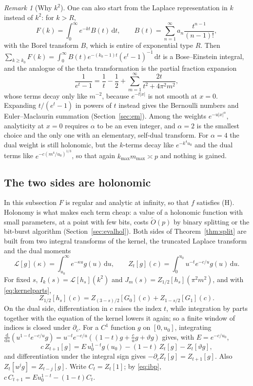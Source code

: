 \documentclass[11pt,reqno]{amsart}
\theoremstyle{definition}
\theoremstyle{remark}
\newtheorem{remark}[theorem]{Remark}
\newcommand{\dd}{\,\mathrm{d}}
\begin{document}
\begin{remark}[Why $k^2$]\label{rem:whyk2}
One can also start from the Laplace representation in $k$ instead of $k^2$: for $k > R$,
\[
  F(k) = \int_0^\infty e^{-kt}B(t)\dd t, \qquad B(t) = \sum_{n=1}^{\infty}a_n\frac{t^{n-1}}{(n-1)!},
\]
with the Borel transform $B$, which is entire of exponential type $R$. Then $\sum_{k\ge k_0}F(k) =
\int_0^\infty B(t)e^{-(k_0-1)t}(e^t-1)^{-1}\dd t$ is a Bose--Einstein integral, and the analogue of the theta
transformation is the partial fraction expansion
\[
  \frac{1}{e^t-1} = \frac1t - \frac12 + \sum_{m=1}^{\infty}\frac{2t}{t^2+4\pi^2m^2},
\]
whose terms decay only like $m^{-2}$, because $e^{-t|x|}$ is not smooth at $x = 0$. Expanding $t/(e^t-1)$ in powers of
$t$ instead gives the Bernoulli numbers and Euler--Maclaurin summation (Section~\ref{sec:em}). Among the weights
$e^{-u|x|^\alpha}$, analyticity at $x = 0$ requires $\alpha$ to be an even integer, and $\alpha = 2$ is the smallest choice
and the only one with an elementary, self-dual transform. For $\alpha = 4$ the dual weight is still holonomic, but the
$k$-terms decay like $e^{-k^4u_0}$ and the dual terms like $e^{-c(m^4/u_0)^{1/3}}$, so that again $k_{\max}m_{\max} \asymp p$
and nothing is gained.
\end{remark}

\subsection{The two sides are holonomic}\label{sec:twosides}
In this subsection $F$ is regular and analytic at infinity, so that $f$ satisfies (H). Holonomy is what makes each term
cheap: a value of a holonomic function with small parameters, at a point with few bits, costs $\widetilde O(p)$ by
binary splitting or the bit-burst algorithm (Section~\ref{sec:evalhol}). Both sides of Theorem~\ref{thm:split} are built from two integral transforms of the kernel, the truncated Laplace
transform and the dual moments
\[
  \mathcal L[g](\kappa) = \int_{u_0}^\infty e^{-\kappa u}g(u)\dd u, \qquad Z_t[g](c) = \int_0^{u_0}u^{-t}e^{-c/u}g(u)\dd u.
\]
For fixed $s$, $I_k(s) = \mathcal L[h_s](k^2)$ and $J_m(s) = Z_{1/2}[h_s](\pi^2m^2)$, and with
\eqref{eq:kernelparts},
\[
  Z_{1/2}[h_s](c) = Z_{(3-s)/2}[G_0](c) + Z_{1-s/2}[G_1](c).
\]
On the dual side, differentiation in $c$ raises the index $t$, while integration by parts together with the equation
of the kernel lowers it again; so a finite window of indices is closed under $\partial_c$. For a $C^1$ function $g$ on $[0,u_0]$, integrating
$\frac{\mathrm d}{\mathrm du}(u^{1-t}e^{-c/u}g) = u^{-t}e^{-c/u}((1-t)g + \frac cug + \vartheta g)$ gives, with $E = e^{-c/u_0}$,
\begin{equation}\label{eq:ibp}
  c\,Z_{t+1}[g] = E\,u_0^{1-t}g(u_0) - (1-t)\,Z_t[g] - Z_t[\vartheta g],
\end{equation}
and differentiation under the integral sign gives $-\partial_cZ_t[g] = Z_{t+1}[g]$. Also $Z_t[u^jg] = Z_{t-j}[g]$.
Write $C_t = Z_t[1]$; by \eqref{eq:ibp}, $c\,C_{t+1} = Eu_0^{1-t} - (1-t)C_t$.
\end{document}
